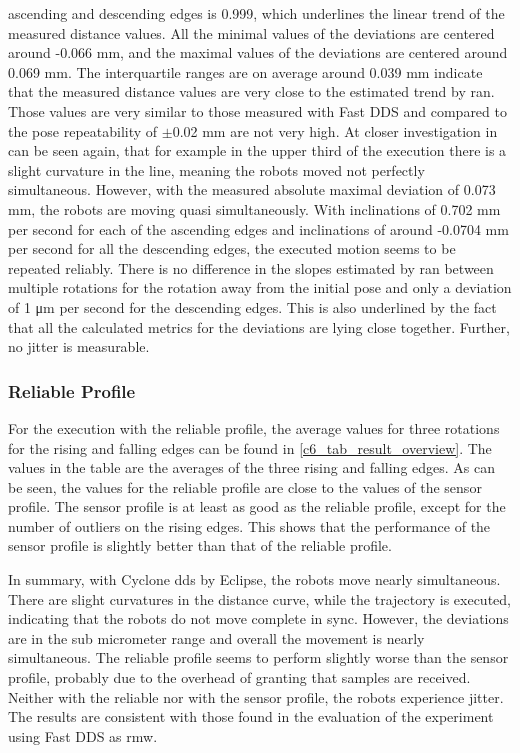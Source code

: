 ascending and descending edges is 0.999, which underlines the linear trend of the measured distance values. All the minimal values of the deviations are centered around -0.066 \si{\milli\meter}, and the maximal values of the deviations are centered around 0.069 \si{\milli\meter}. The interquartile ranges are on average around 0.039 \si{\milli\meter} indicate that the measured distance values are very close to the estimated trend by \gls{ran}. Those values are very similar to those measured with Fast DDS and compared to the pose repeatability of $\pm$0.02 \si{\milli\meter} are not very high. At closer investigation in can be seen again, that for example in the upper third of the execution there is a slight curvature in the line, meaning the robots moved not perfectly simultaneous. However, with the measured absolute maximal deviation of 0.073 \si{\milli\meter}, the robots are moving quasi simultaneously.\newline
With inclinations of 0.702 \si{\milli\meter} per second for each of the ascending edges and inclinations of around -0.0704 \si{\milli\meter} per second for all the descending edges, the executed motion seems to be repeated reliably. There is no difference in the slopes estimated by \gls{ran} between multiple rotations for the rotation away from the initial pose and only a deviation of 1 \si{\micro\meter} per second for the descending edges. This is also underlined by the fact that all the calculated metrics for the deviations are lying close together. Further, no jitter is measurable. 

\subsubsection{Reliable Profile}
For the execution with the reliable profile, the average values for three rotations for the rising and falling edges can be found in \autoref{c6_tab_result_overview}. The values in the table are the averages of the three rising and falling edges. As can be seen, the values for the reliable profile are close to the values of the sensor profile. The sensor profile is at least as good as the reliable profile, except for the number of outliers on the rising edges. This shows that the performance of the sensor profile is slightly better than that of the reliable profile.

In summary, with Cyclone \gls{dds} by Eclipse, the robots move nearly simultaneous. There are slight curvatures in the distance curve, while the trajectory is executed, indicating that the robots do not move complete in sync. However, the deviations are in the sub micrometer range and overall the movement is nearly simultaneous. The reliable profile seems to perform slightly worse than the sensor profile, probably due to the overhead of granting that samples are received. Neither with the reliable nor with the sensor profile, the robots experience jitter. The results are consistent with those found in the evaluation of the experiment using Fast DDS as \gls{rmw}.

